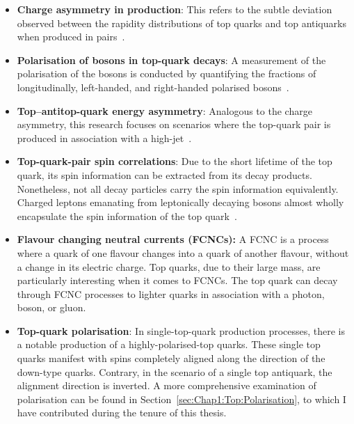 \begin{itemize}
	\item \textbf{Charge asymmetry in \ttbar production}: This refers to the subtle deviation observed between the rapidity distributions of top quarks and top antiquarks when produced in pairs~\cite{ATLAS:2022wec}.
	
	\item \textbf{Polarisation of \PW bosons in top-quark decays}: A measurement of the polarisation of the \PW bosons is conducted by quantifying the fractions of longitudinally, left-handed, and right-handed polarised \PW bosons~\cite{ATLAS:2022rms}.
	
	\item \textbf{Top--antitop-quark energy asymmetry}: Analogous to the charge asymmetry, this research focuses on scenarios where the top-quark pair is produced in association with a high-\pT jet~\cite{ATLAS:2021dqb}.
	
	\item \textbf{Top-quark-pair spin correlations}: Due to the  short lifetime of the top quark, its spin information can be extracted from its decay products. Nonetheless, not all decay particles carry the spin information equivalently.  Charged leptons emanating from leptonically decaying \PW bosons almost wholly encapsulate the spin information of the top quark~\cite{ATLAS:2019zrq}.
	
	\item \textbf{Flavour changing neutral currents (FCNCs):} A FCNC is a process where a quark 
	of one flavour changes into a quark of another flavour, without a change in its electric charge. 
	Top quarks, due to their large mass, are particularly interesting when it comes to FCNCs. 
	The top quark can decay through FCNC processes to lighter quarks in association with a photon, \PZ boson, or gluon.
	
	\item \textbf{Top-quark polarisation}: In \tchannel single-top-quark production processes, there is a notable production of a highly-polarised-top quarks. These single top quarks manifest with spins completely aligned along the direction of the down-type quarks. Contrary, in the scenario of a single top antiquark, the alignment direction is inverted. A more comprehensive examination of polarisation can be found in Section~\ref{sec:Chap1:Top:Polarisation}, to which I have contributed during the tenure of this thesis. 
\end{itemize}%


